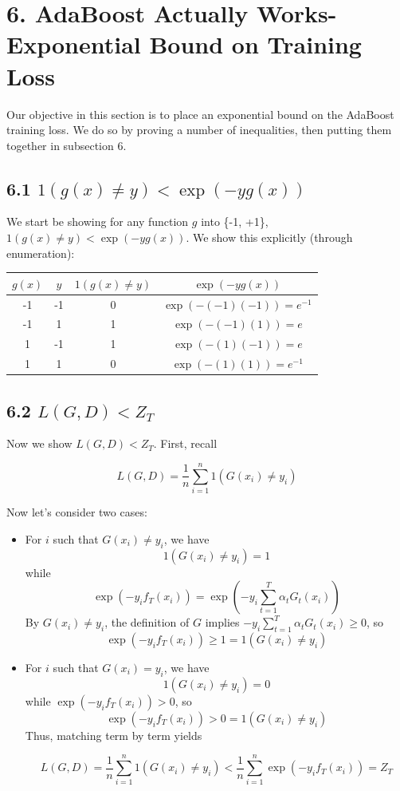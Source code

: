 \documentclass[paper=a4, fontsize=11pt]{scrartcl} %
\numberwithin{equation}{section} %
\numberwithin{figure}{section} %
\numberwithin{table}{section} %
\begin{document}

\section*{6. AdaBoost Actually Works- Exponential Bound on Training Loss}

Our objective in this section is to place an exponential bound on the AdaBoost training loss. We do so by proving a number of inequalities, then putting them together in subsection 6.

\subsection*{6.1 $1(g(x) \ne y) < \exp(-yg(x))$}

We start be showing for any function $g$ into \{-1, +1\}, $1(g(x) \ne y) < \exp(-yg(x))$. We show this explicitly (through enumeration):
\begin{center}
\begin{tabular}{ | c | c | c | c |}
\hline
$g(x)$ & $y$ & $1(g(x) \ne y)$ & $\exp(-y g(x))$ \\
\hline
-1 & -1 & 0 & $\exp(-(-1)(-1)) = e^{-1}$ \\
\hline
-1 & 1 & 1& $\exp(-(-1)(1)) = e$ \\
\hline
1 & -1 & 1 & $\exp(-(1)(-1)) = e$ \\
\hline
1 & 1 & 0 & $\exp(-(1)(1)) = e^{-1}$ \\
\hline
\end{tabular}
\end{center}

\subsection*{6.2 $L(G,D) < Z_T$}

Now we show $L(G,D) < Z_T$. First, recall

\[L(G,D) = \frac{1}{n} \sum_{i=1}^n 1(G(x_i) \ne y_i)\]

Now let's consider two cases:
\begin{itemize}
\item For $i$ such that $G(x_i) \ne y_i$, we have
\[1(G(x_i) \ne y_i) = 1\]
while
\[\exp(-y_i f_T(x_i)) = \exp(-y_i \sum_{t = 1}^T \alpha_t G_t(x_i))\]
By $G(x_i) \ne y_i$, the definition of $G$ implies $-y_i \sum_{t = 1}^T \alpha_tG_t(x_i) \geq 0$, so 
\[\exp(-y_i f_T(x_i)) \geq 1 = 1(G(x_i) \ne y_i)\]
\item For $i$ such that $G(x_i) = y_i$, we have
\[1(G(x_i) \ne y_i) = 0\]
while $\exp(-y_i f_T(x_i)) > 0 $, so 
\[\exp(-y_i f_T(x_i)) > 0 = 1(G(x_i) \ne y_i)\]
Thus, matching term by term yields 

\[L(G,D) = \frac{1}{n} \sum_{i=1}^n 1(G(x_i) \ne y_i) < \frac{1}{n} \sum_{i=1}^n \exp(-y_i f_T(x_i)) = Z_T \]
\end{itemize}
\end{document}
